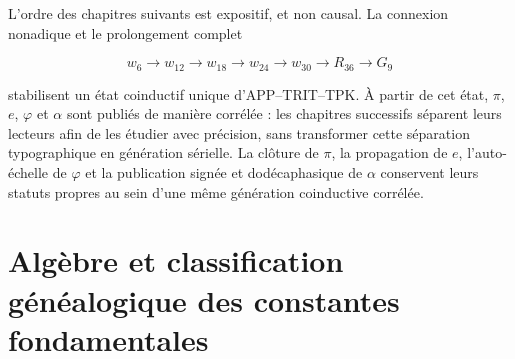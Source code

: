


L'ordre des chapitres suivants est expositif, et non causal. La connexion nonadique et le prolongement complet

\[
w_6\longrightarrow w_{12}\longrightarrow w_{18}\longrightarrow w_{24}
\longrightarrow w_{30}\longrightarrow R_{36}\longrightarrow G_9
\]

stabilisent un état coinductif unique d'APP--TRIT--TPK. À partir de cet état, \(\pi\), \(e\), \(\varphi\) et \(\alpha\) sont publiés de manière corrélée : les chapitres successifs séparent leurs lecteurs afin de les étudier avec précision, sans transformer cette séparation typographique en génération sérielle. La clôture de \(\pi\), la propagation de \(e\), l'auto-échelle de \(\varphi\) et la publication signée et dodécaphasique de \(\alpha\) conservent leurs statuts propres au sein d'une même génération coinductive corrélée.


\HMTFlushCurrentChapter
\chapter{Algèbre et classification généalogique des constantes fondamentales}%
\begingroup
\renewcommand{\chapter}[2][]{}%
%
\endgroup

\begin{HMTScientificOwnerSubordinated}



\end{HMTScientificOwnerSubordinated}

